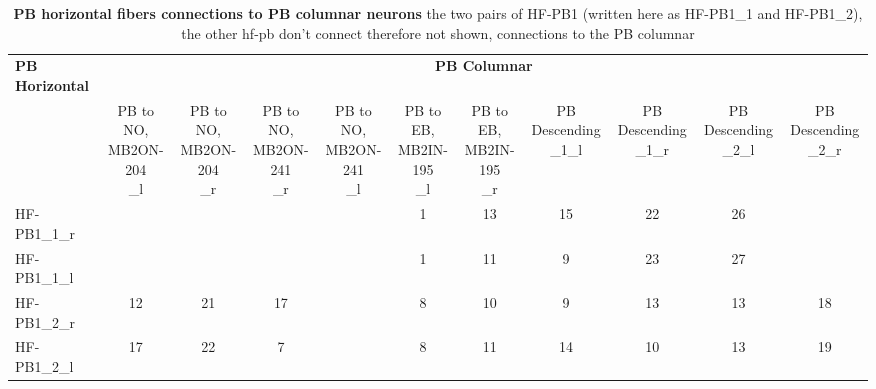         \begin{table}[h!] [H]
        \centering
        \begin{tabular}{l|cccccccccc}
        \toprule
        \textbf{PB Horizontal} & \multicolumn{10}{c}{\textbf{PB Columnar}} \\
        \cmidrule(lr){2-11}
        & \rot{PB to NO,\\MB2ON-204\\\_l}
        & \rot{PB to NO,\\MB2ON-204\\\_r}
        & \rot{PB to NO,\\MB2ON-241\\\_r}
        & \rot{PB to NO,\\MB2ON-241\\\_l}
        & \rot{PB to EB,\\MB2IN-195\\\_l}
        & \rot{PB to EB,\\MB2IN-195\\\_r}
        & \rot{PB Descending\\\_1\_l}
        & \rot{PB Descending\\\_1\_r}
        & \rot{PB Descending\\\_2\_l}
        & \rot{PB Descending\\\_2\_r} \\
        \midrule
        HF-PB1\_1\_r
        &  &  &  &
        & \cellcolor{forest1}1
        & \cellcolor{forest3}13
        & \cellcolor{forest3}15
        & \cellcolor{forest4}22
        & \cellcolor{forest5}26
        &  \\

        HF-PB1\_1\_l
        &  &  &  &
        & \cellcolor{forest1}1
        & \cellcolor{forest2}11
        & \cellcolor{forest2}9
        & \cellcolor{forest4}23
        & \cellcolor{forest5}27
        &  \\

        HF-PB1\_2\_r
        & \cellcolor{forest3}12
        & \cellcolor{forest4}21
        & \cellcolor{forest3}17
        &
        & \cellcolor{forest2}8
        & \cellcolor{forest2}10
        & \cellcolor{forest2}9
        & \cellcolor{forest3}13
        & \cellcolor{forest3}13
        & \cellcolor{forest4}18 \\

        HF-PB1\_2\_l
        & \cellcolor{forest3}17
        & \cellcolor{forest4}22
        & \cellcolor{forest2}7
        &
        & \cellcolor{forest2}8
        & \cellcolor{forest3}11
        & \cellcolor{forest3}14
        & \cellcolor{forest2}10
        & \cellcolor{forest3}13
        & \cellcolor{forest4}19 \\
        \bottomrule
        \end{tabular}
        \caption[PB horizontal fibers connection to  PB columnar ]{\textbf{PB horizontal fibers connections to  PB columnar neurons} the two pairs of HF-PB1 (written here as HF-PB1\_1 and HF-PB1\_2), the other hf-pb don't connect therefore not shown, connections to the PB columnar  }
        \label{PBconnections}
        \end{table}



